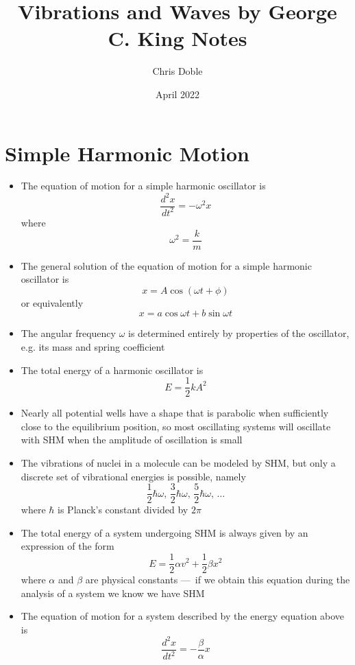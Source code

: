\documentclass{article}
\title{Vibrations and Waves by George C. King Notes}
\author{Chris Doble}
\date{April 2022}
\begin{document}
\maketitle

\tableofcontents

\section{Simple Harmonic Motion}

\begin{itemize}
  \item The equation of motion for a simple harmonic oscillator is \[\frac{d^2 x}{d t^2} = -\omega^2 x\] where \[\omega^2 = \frac{k}{m}\]

  \item The general solution of the equation of motion for a simple harmonic oscillator is \[x = A \cos (\omega t + \phi)\] or equivalently \[x = a \cos \omega t + b \sin \omega t\]

  \item The angular frequency $\omega$ is determined entirely by properties of the oscillator, e.g. its mass and spring coefficient

  \item The total energy of a harmonic oscillator is \[E = \frac{1}{2} k A^2\]

  \item Nearly all potential wells have a shape that is parabolic when sufficiently close to the equilibrium position, so most oscillating systems will oscillate with SHM when the amplitude of oscillation is small

  \item The vibrations of nuclei in a molecule can be modeled by SHM, but only a discrete set of vibrational energies is possible, namely \[\frac{1}{2} \hbar \omega, \, \frac{3}{2} \hbar \omega, \, \frac{5}{2} \hbar \omega, \, \ldots\] where $\hbar$ is Planck's constant divided by $2 \pi$

  \item The total energy of a system undergoing SHM is always given by an expression of the form \[E = \frac{1}{2} \alpha v^2 + \frac{1}{2} \beta x^2\] where $\alpha$ and $\beta$ are physical constants — if we obtain this equation during the analysis of a system we know we have SHM

  \item The equation of motion for a system described by the energy equation above is \[\frac{d^2 x}{d t^2} = -\frac{\beta}{\alpha} x\]
\end{itemize}
\end{document}
